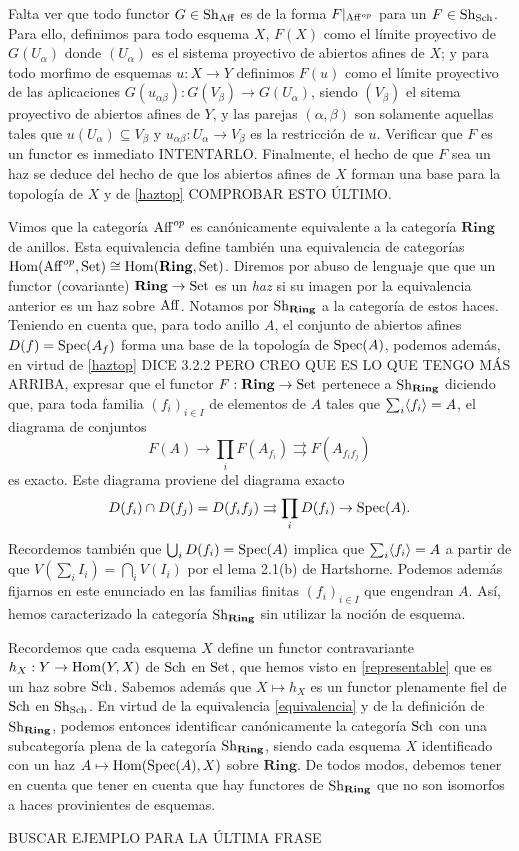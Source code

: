 \documentclass[twoside]{article}
\begin{document}
 Falta ver que todo functor $G\in\operatorname{Sh}_{\operatorname{Aff}}$ es de la forma $F|_{\operatorname{Aff}^{op}}$ para un $F\in \operatorname{Sh}_{\operatorname{Sch}}$. Para ello, definimos para todo esquema $X$, $F(X)$ como el límite proyectivo de $G(U_\alpha)$ donde $(U_\alpha)$ es el sistema proyectivo de abiertos afines de $X$; y para todo morfimo de esquemas $u:X\to Y$ definimos $F(u)$ como el límite proyectivo de las aplicaciones $G(u_{\alpha\beta}):G(V_\beta)\to G(U_\alpha)$, siendo $(V_\beta)$ el sitema proyectivo de abiertos afines de $Y$, y las parejas $(\alpha,\beta)$ son solamente aquellas tales que $u(U_\alpha)\subseteq V_\beta$ y $u_{\alpha\beta}:U_\alpha\to V_\beta$ es la restricción de $u$. Verificar que $F$ es un functor es inmediato INTENTARLO. Finalmente, el hecho de que $F$ sea un haz se deduce del hecho de que los abiertos afines de $X$ forman una base para la topología de $X$ y de \ref{haztop} COMPROBAR ESTO ÚLTIMO.
 
 
 Vimos que la categoría $\operatorname{Aff}^{op}$ es canónicamente equivalente a la categoría $\mathrm{\mathbf{Ring}}$ de anillos. Esta equivalencia define también una equivalencia de categorías $\operatorname{Hom}(\operatorname{Aff}^{op},\operatorname{Set})\cong \operatorname{Hom}(\mathrm{\mathbf{Ring}},\operatorname{Set})$. Diremos por abuso de lenguaje que que un functor (covariante) $\mathrm{\mathbf{Ring}}\to\operatorname{Set}$ es un \emph{haz} si su imagen por la equivalencia anterior es un haz sobre $\operatorname{Aff}$. Notamos por $\operatorname{Sh}_{\mathrm{\mathbf{Ring}}}$ a la categoría de estos haces. Teniendo en cuenta que, para todo anillo $A$, el conjunto de abiertos afines $D(f)=\operatorname{Spec}(A_f)$ forma una base de la topología de $\operatorname{Spec}(A)$, podemos además, en virtud de \ref{haztop} DICE 3.2.2 PERO CREO QUE ES LO QUE TENGO MÁS ARRIBA, expresar que el functor $F:\mathrm{\mathbf{Ring}}\to\operatorname{Set}$ pertenece a $\operatorname{Sh}_{\mathrm{\mathbf{Ring}}}$ diciendo que, para toda familia $(f_i)_{i\in I}$ de elementos de $A$ tales que $\sum_i \langle{f_i}\rangle=A$, el diagrama de conjuntos
 \[F(A)\to\prod_i F(A_{f_i})\rightrightarrows F(A_{f_if_j})\]
es exacto. Este diagrama proviene del diagrama exacto
\[
D(f_i)\cap D(f_j)=D(f_if_j)\rightrightarrows \prod_i D(f_i)\to \operatorname{Spec}(A).
\] 
Recordemos también que $\bigcup_i D(f_i)=\operatorname{Spec}(A)$ implica que $\sum_i\langle{f_i}\rangle=A$ a partir de que $V(\sum_i I_i)=\bigcap_i V(I_i)$ por el lema 2.1(b) de Hartshorne. Podemos además fijarnos en este enunciado en las familias finitas $(f_i)_{i\in I}$ que engendran $A$. %
Así, hemos caracterizado la categoría $\operatorname{Sh}_{\mathrm{\mathbf{Ring}}}$ sin utilizar la noción de esquema. 


Recordemos que cada esquema $X$ define un functor contravariante $h_X:Y\to\operatorname{Hom}(Y,X)$ de $\operatorname{Sch}$ en $\operatorname{Set}$, que hemos visto en \ref{representable} que es un haz sobre $\operatorname{Sch}$. Sabemos además que $X\mapsto h_X$ es un functor plenamente fiel de $\operatorname{Sch}$ en $\operatorname{Sh}_{\operatorname{Sch}}$. En virtud de la equivalencia \ref{equivalencia} y de la definición de $\operatorname{Sh}_{\mathrm{\mathbf{Ring}}}$, podemos entonces identificar canónicamente la categoría $\operatorname{Sch}$ con una subcategoría plena de la categoría $\operatorname{Sh}_{\mathrm{\mathbf{Ring}}}$, siendo cada esquema $X$ identificado con un haz $A\mapsto \operatorname{Hom}(\operatorname{Spec}(A),X)$ sobre $\mathrm{\mathbf{Ring}}$. De todos modos, debemos tener en cuenta que tener en cuenta que hay functores de $\operatorname{Sh}_{\mathrm{\mathbf{Ring}}}$ que no son isomorfos a haces provinientes de esquemas. 
 
 BUSCAR EJEMPLO PARA LA ÚLTIMA FRASE
\end{document}
